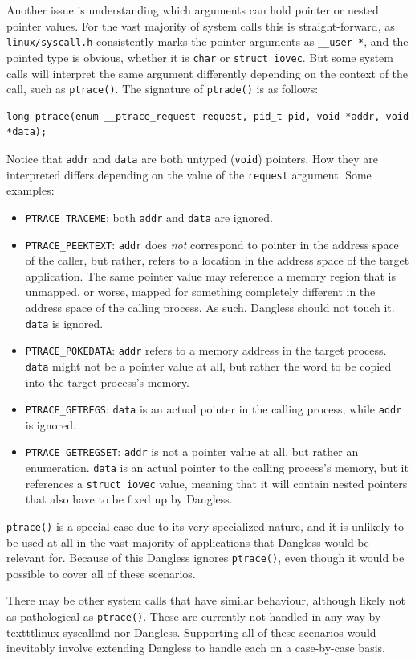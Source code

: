 Another issue is understanding which arguments can hold pointer or nested pointer values. For the vast majority of system calls this is straight-forward, as \texttt{linux/syscall.h} consistently marks the pointer arguments as \lstinline!__user *!, and the pointed type is obvious, whether it is \lstinline!char! or \lstinline!struct iovec!. But some system calls will interpret the same argument differently depending on the context of the call, such as \lstinline!ptrace()!. The signature of \lstinline!ptrade()! is as follows:

\begin{lstlisting}
long ptrace(enum __ptrace_request request, pid_t pid, void *addr, void *data);
\end{lstlisting}

Notice that \lstinline!addr! and \lstinline!data! are both untyped (\lstinline!void!) pointers. How they are interpreted differs depending on the value of the \lstinline!request! argument. Some examples:

\begin{itemize}
	\item \lstinline!PTRACE_TRACEME!: both \lstinline!addr! and \lstinline!data! are ignored.
	\item \lstinline!PTRACE_PEEKTEXT!: \lstinline!addr! does \emph{not} correspond to pointer in the address space of the caller, but rather, refers to a location in the address space of the target application. The same pointer value may reference a memory region that is unmapped, or worse, mapped for something completely different in the address space of the calling process. As such, Dangless should not touch it. \lstinline!data! is ignored.
	\item \lstinline!PTRACE_POKEDATA!: \lstinline!addr! refers to a memory address in the target process. \lstinline!data! might not be a pointer value at all, but rather the word to be copied into the target process's memory.
	\item \lstinline!PTRACE_GETREGS!: \lstinline!data! is an actual pointer in the calling process, while \lstinline!addr! is ignored.
	\item \lstinline!PTRACE_GETREGSET!: \lstinline!addr! is not a pointer value at all, but rather an enumeration. \lstinline!data! is an actual pointer to the calling process's memory, but it references a \lstinline!struct iovec! value, meaning that it will contain nested pointers that also have to be fixed up by Dangless.
\end{itemize}

\lstinline!ptrace()! is a special case due to its very specialized nature, and it is unlikely to be used at all in the vast majority of applications that Dangless would be relevant for. Because of this Dangless ignores \lstinline!ptrace()!, even though it would be possible to cover all of these scenarios.

There may be other system calls that have similar behaviour, although likely not as pathological as \lstinline!ptrace()!. These are currently not handled in any way by texttt{linux-syscallmd} nor Dangless. Supporting all of these scenarios would inevitably involve extending Dangless to handle each on a case-by-case basis.
